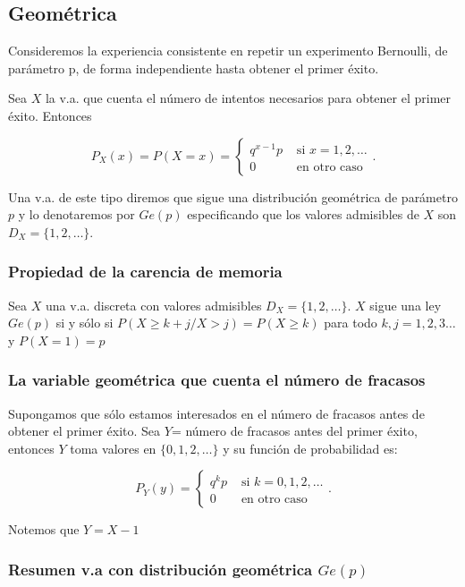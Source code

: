 \documentclass[12pt]{report}
\begin{document}
 \subsection{Geométrica } Consideremos la experiencia consistente en repetir
    un experimento Bernoulli, de parámetro p, de forma independiente
    hasta obtener
    el primer éxito.


    Sea $X$ la v.a. que cuenta el número de intentos
    necesarios para obtener el primer éxito. Entonces

$$P_X(x)=P(X=x)=\left\{\begin{array}{ll}
 q^{x-1} p & \mbox{ si } x=1,2,\ldots\\
 0 &\mbox{ en otro caso}
    \end{array}\right..$$

  Una v.a. de este tipo diremos que sigue una
    distribución geométrica de parámetro $p$ y lo denotaremos por $Ge(p)$ especificando que
    los valores admisibles de $X$ son $D_X=\{1,2,\ldots\}$.

    \subsubsection{Propiedad de la carencia de memoria}
    Sea $X$ una v.a. discreta con valores admisibles $D_X=\{1,2,\ldots\}$.
    $X$ sigue una ley $Ge(p)$ si y sólo si  $P(X\geq k+j/X> j)=P(X\geq k)$ para
    todo $k,j=1,2,3\ldots$ y $P(X=1)=p$

    \subsubsection{La variable geométrica que cuenta el número de fracasos}

    Supongamos que sólo estamos interesados en el número de fracasos antes de obtener el
    primer éxito. Sea $Y$= número de fracasos antes del primer éxito, entonces $Y$ toma
    valores en $\{0,1,2,\ldots\}$ y su función de probabilidad es:

    $$P_Y(y)=\left\{\begin{array}{ll}
 q^k p & \mbox{ si } k=0,1,2,\ldots\\
 0 &\mbox{ en otro caso}
    \end{array}\right..$$

Notemos que $Y=X-1$

        \subsubsection{Resumen v.a con distribución geométrica $Ge(p)$}
\end{document}
